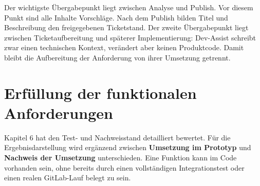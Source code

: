 Der wichtigste Übergabepunkt liegt zwischen Analyse und Publish. Vor diesem Punkt sind alle Inhalte Vorschläge. Nach dem Publish bilden Titel und Beschreibung den freigegebenen Ticketstand. Der zweite Übergabepunkt liegt zwischen Ticketaufbereitung und späterer Implementierung: Dev-Assist schreibt zwar einen technischen Kontext, verändert aber keinen Produktcode. Damit bleibt die Aufbereitung der Anforderung von ihrer Umsetzung getrennt.

\section{Erfüllung der funktionalen Anforderungen}

Kapitel 6 hat den Test- und Nachweisstand detailliert bewertet. Für die Ergebnisdarstellung wird ergänzend zwischen \textbf{Umsetzung im Prototyp} und \textbf{Nachweis der Umsetzung} unterschieden. Eine Funktion kann im Code vorhanden sein, ohne bereits durch einen vollständigen Integrationstest oder einen realen GitLab-Lauf belegt zu sein.

